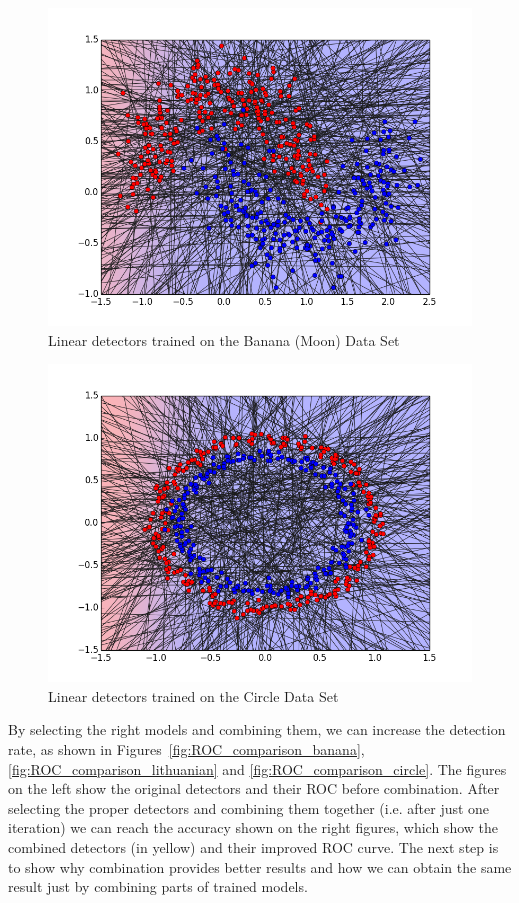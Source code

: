 \begin{figure}[H]
\centering
\includegraphics[scale=0.6]{figs/AllClassifiersBanana}
\caption{Linear detectors trained on the Banana (Moon) Data Set}
\label{Figure::banana_all}
\end{figure}

\begin{figure}[H]
\centering
\includegraphics[scale=0.6]{figs/AllClassifiersCircle}
\caption{Linear detectors trained on the Circle Data Set}
\label{Figure::circle_all}
\end{figure}

By selecting the right models and combining them, we can increase the detection rate, as shown in Figures~\ref{fig:ROC_comparison_banana}, \ref{fig:ROC_comparison_lithuanian} and \ref{fig:ROC_comparison_circle}. The figures on the left show the original detectors and their ROC before combination. After selecting the proper detectors and combining them together (i.e. after just one iteration) we can reach the accuracy shown on the right figures, which show the combined detectors (in yellow) and their improved ROC curve. The next step is to show why combination provides better results and how we can obtain the same result just by combining parts of trained models.


